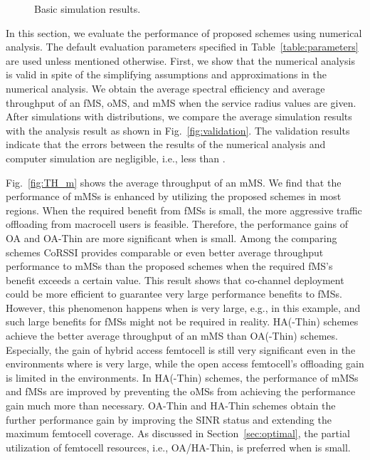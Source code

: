 \documentclass[journal]{IEEEtran}
\begin{document}
\begin{figure*}
\centering {}\hfill
{}\hfill
{}
\caption{Basic simulation results.} \label{fig:basic_simulations}
\end{figure*}
In this section, we evaluate the performance of proposed schemes using numerical
analysis.
The default evaluation parameters specified in Table~\ref{table:parameters}
are used unless mentioned otherwise.
First, we show that the
numerical analysis is valid in spite of the simplifying
assumptions and approximations in the numerical analysis.
We obtain the average spectral efficiency and average throughput of an fMS,
oMS, and  mMS when the service radius  values are given.
After simulations with  distributions, we compare the average simulation
results with the analysis result as shown in Fig.~\ref{fig:validation}.
The validation results indicate that
the errors between the results of the numerical analysis and computer simulation
are negligible, i.e., less than .

Fig.~\ref{fig:TH_m} shows the average throughput of an mMS.
We find that the performance of  mMSs is enhanced by utilizing the proposed
schemes in most regions. When the required benefit from fMSs is small,
the more aggressive traffic offloading from macrocell users is feasible.
Therefore, the performance gains of OA and OA-Thin are more significant when  is small.
Among the comparing schemes CoRSSI provides
comparable or even better average throughput performance to mMSs than the proposed schemes when the required fMS's benefit exceeds a certain value.
This result shows that co-channel deployment could be more efficient
to guarantee very large performance benefits to fMSs.
However, this phenomenon happens when  is very large, e.g.,  in this example, and such large benefits for fMSs might not be required in reality.
HA(-Thin) schemes achieve the better average throughput of an mMS than OA(-Thin) schemes.
Especially, the gain of hybrid access femtocell is still very significant
even in the environments where  is very large, while the open access femtocell's offloading gain is limited in the environments.
In HA(-Thin) schemes, the performance of mMSs and fMSs  are
improved by preventing the oMSs from achieving the performance gain
much more than necessary.
OA-Thin and HA-Thin schemes obtain the further performance gain by
improving the SINR status and extending the maximum femtocell coverage.
As discussed in Section~\ref{sec:optimal}, the partial utilization of femtocell resources, i.e., OA/HA-Thin, is preferred when  is small.
\end{document}
